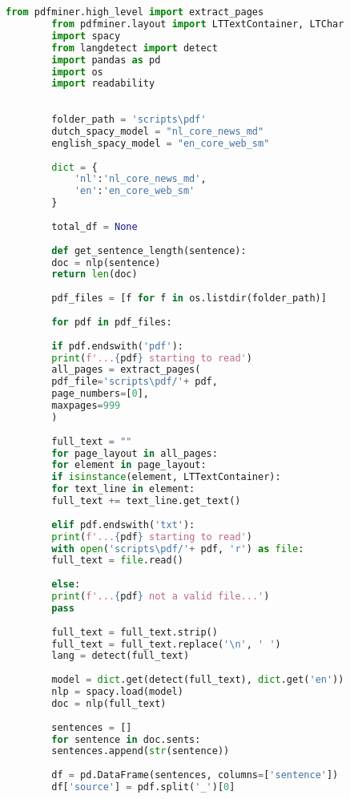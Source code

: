 \chapter{}%
\label{ch:bijlage-code}


\begin{center}
	\begin{lstlisting}[language=Python, caption={Script voor text-analyse met Readability}, label={code:script-for-text-analysis}]
		from pdfminer.high_level import extract_pages
		from pdfminer.layout import LTTextContainer, LTChar
		import spacy
		from langdetect import detect
		import pandas as pd
		import os
		import readability
		
		
		folder_path = 'scripts\pdf'
		dutch_spacy_model = "nl_core_news_md"
		english_spacy_model = "en_core_web_sm"
		
		dict = {
			'nl':'nl_core_news_md',
			'en':'en_core_web_sm'
		}
		
		total_df = None
		
		def get_sentence_length(sentence):
		doc = nlp(sentence)
		return len(doc)
		
		pdf_files = [f for f in os.listdir(folder_path)]
		
		for pdf in pdf_files:
		
		if pdf.endswith('pdf'):
		print(f'...{pdf} starting to read')
		all_pages = extract_pages(
		pdf_file='scripts\pdf/'+ pdf,
		page_numbers=[0],
		maxpages=999
		)
		
		full_text = ""
		for page_layout in all_pages:
		for element in page_layout:
		if isinstance(element, LTTextContainer):		
		for text_line in element:
		full_text += text_line.get_text()
		
		elif pdf.endswith('txt'):
		print(f'...{pdf} starting to read')
		with open('scripts\pdf/'+ pdf, 'r') as file:
		full_text = file.read()
		
		else:
		print(f'...{pdf} not a valid file...')
		pass
		
		full_text = full_text.strip()
		full_text = full_text.replace('\n', ' ')
		lang = detect(full_text)
		
		model = dict.get(detect(full_text), dict.get('en'))
		nlp = spacy.load(model)
		doc = nlp(full_text)
		
		sentences = []
		for sentence in doc.sents:
		sentences.append(str(sentence))
		
		df = pd.DataFrame(sentences, columns=['sentence'])
		df['source'] = pdf.split('_')[0]
		

\end{lstlisting}
\end{center}
